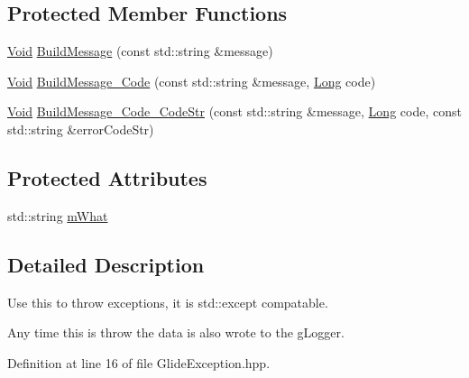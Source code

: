 \subsection*{Protected Member Functions}
\begin{DoxyCompactItemize}
\item 
\hyperlink{_basic_types_8hpp_afdf0f22c576e6ee1b982f64b839c4bea}{Void} \hyperlink{classgl_1_1_glide_exception_aef61dcf7d8844dff478b7be0e762914f}{Build\-Message} (const std\-::string \&message)
\item 
\hyperlink{_basic_types_8hpp_afdf0f22c576e6ee1b982f64b839c4bea}{Void} \hyperlink{classgl_1_1_glide_exception_a3a7e5acc5f75f29da43430ff39f8d5c4}{Build\-Message\-\_\-\-Code} (const std\-::string \&message, \hyperlink{_basic_types_8hpp_a57ba1b89723b1138a6c560e57422acd5}{Long} code)
\item 
\hyperlink{_basic_types_8hpp_afdf0f22c576e6ee1b982f64b839c4bea}{Void} \hyperlink{classgl_1_1_glide_exception_ac3327c44f3918052e70c05e7051903d2}{Build\-Message\-\_\-\-Code\-\_\-\-Code\-Str} (const std\-::string \&message, \hyperlink{_basic_types_8hpp_a57ba1b89723b1138a6c560e57422acd5}{Long} code, const std\-::string \&error\-Code\-Str)
\end{DoxyCompactItemize}
\subsection*{Protected Attributes}
\begin{DoxyCompactItemize}
\item 
std\-::string \hyperlink{classgl_1_1_glide_exception_afb68bf6b714e824ce58bef03f4264b91}{m\-What}
\end{DoxyCompactItemize}


\subsection{Detailed Description}
Use this to throw exceptions, it is std\-::except compatable.

Any time this is throw the data is also wrote to the g\-Logger. 

Definition at line 16 of file Glide\-Exception.\-hpp.



